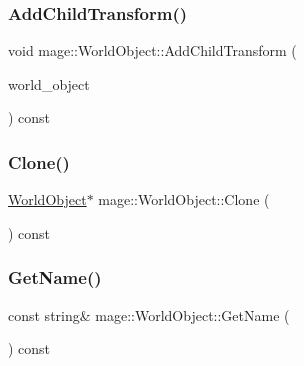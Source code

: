 \subsubsection{\texorpdfstring{Add\+Child\+Transform()}{AddChildTransform()}}
{\footnotesize\ttfamily void mage\+::\+World\+Object\+::\+Add\+Child\+Transform (\begin{DoxyParamCaption}\item[{const \hyperlink{classmage_1_1_world_object}{World\+Object} \&}]{world\+\_\+object }\end{DoxyParamCaption}) const\hspace{0.3cm}{\ttfamily [protected]}}

\hypertarget{classmage_1_1_world_object_a6f464ec7f71740bb89a3ffb0cf6369b2}{}\label{classmage_1_1_world_object_a6f464ec7f71740bb89a3ffb0cf6369b2} 
\subsubsection{\texorpdfstring{Clone()}{Clone()}}
{\footnotesize\ttfamily \hyperlink{classmage_1_1_world_object}{World\+Object}$\ast$ mage\+::\+World\+Object\+::\+Clone (\begin{DoxyParamCaption}{ }\end{DoxyParamCaption}) const}

\hypertarget{classmage_1_1_world_object_a3aab270d50a8d9ab1f9a970d3e04245f}{}\label{classmage_1_1_world_object_a3aab270d50a8d9ab1f9a970d3e04245f} 
\subsubsection{\texorpdfstring{Get\+Name()}{GetName()}}
{\footnotesize\ttfamily const string\& mage\+::\+World\+Object\+::\+Get\+Name (\begin{DoxyParamCaption}{ }\end{DoxyParamCaption}) const}

\hypertarget{classmage_1_1_world_object_a9f0ff4d1d3b3c2dd63e91e8127023f47}{}\label{classmage_1_1_world_object_a9f0ff4d1d3b3c2dd63e91e8127023f47} 
